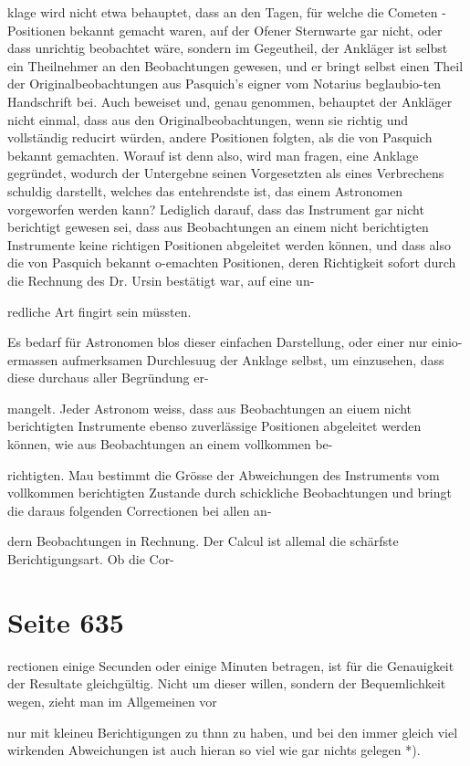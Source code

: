 \documentclass[10pt,a4paper]{article}
\begin{document}
klage wird nicht etwa behauptet, dass an den Tagen, für welche die Cometen -Positionen bekannt gemacht waren, auf der Ofener Sternwarte gar nicht, oder dass unrichtig beobachtet wäre, sondern im Gegeutheil, der Ankläger ist selbst ein Theilnehmer an den Beobachtungen gewesen, und er bringt selbst einen Theil der Originalbeobachtungen aus Pasquich's eigner vom Notarius beglaubio-ten Handschrift bei. Auch beweiset und, genau genommen, behauptet der Ankläger nicht einmal, dass aus den Originalbeobachtungen, wenn sie richtig und vollständig reducirt würden, andere Positionen folgten, als die von Pasquich bekannt gemachten. Worauf ist denn also, wird man fragen, eine Anklage gegründet, wodurch der Untergebne seinen Vorgesetzten als eines Verbrechens schuldig darstellt, welches das entehrendste ist, das einem Astronomen vorgeworfen werden kann? Lediglich darauf, dass das Instrument gar nicht berichtigt gewesen sei, dass aus Beobachtungen an einem nicht berichtigten Instrumente keine richtigen Positionen abgeleitet werden können, und dass also die von Pasquich bekannt o-emachten Positionen, deren Richtigkeit sofort durch die Rechnung des Dr. Ursin bestätigt war, auf eine un-

redliche Art fingirt sein müssten.

Es bedarf für Astronomen blos dieser einfachen Darstellung, oder einer nur einio-ermassen aufmerksamen Durchlesuug der Anklage selbst, um einzusehen, dass diese durchaus aller Begründung er-

mangelt. Jeder Astronom weiss, dass aus Beobachtungen an eiuem nicht berichtigten Instrumente ebenso zuverlässige Positionen abgeleitet werden können, wie aus Beobachtungen an einem vollkommen be-

richtigten. Mau bestimmt die Grösse der Abweichungen des Instruments vom vollkommen berichtigten Zustande durch schickliche Beobachtungen und bringt die daraus folgenden Correctionen bei allen an-

dern Beobachtungen in Rechnung. Der Calcul ist allemal die schärfste Berichtigungsart. Ob die Cor-


\newpage
\section*{Seite 635}
rectionen einige Secunden oder einige Minuten betragen, ist für die Genauigkeit der Resultate gleichgültig. Nicht um dieser willen, sondern der Bequemlichkeit wegen, zieht man im Allgemeinen vor

nur mit kleineu Berichtigungen zu thnn zu haben, und bei den immer gleich viel wirkenden Abweichungen ist auch hieran so viel wie gar nichts gelegen *).
\end{document}
